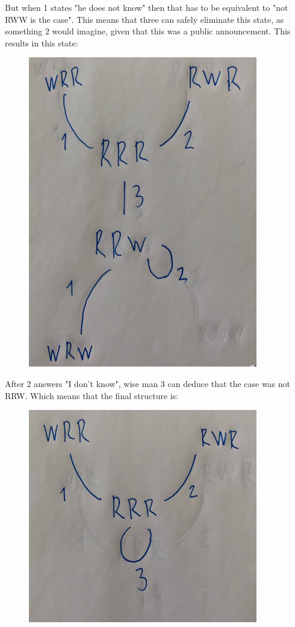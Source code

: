 But when 1 states "he does not know" then that has to be equivalent to "not RWW is the case". This means that three can safely eliminate this state, as something 2 would imagine, given that this was a public announcement. This results in this state:
\begin{figure}[H]
	\center
\includegraphics[width=10cm]{images/three_wise_men_round_1.png}
\end{figure}

After 2 answers "I don't know", wise man 3 can deduce that the case was not RRW. Which means that the final structure is:

\begin{figure}[H]
	\center
\includegraphics[width=10cm]{images/three_wise_men_round_2.png}
\end{figure}

